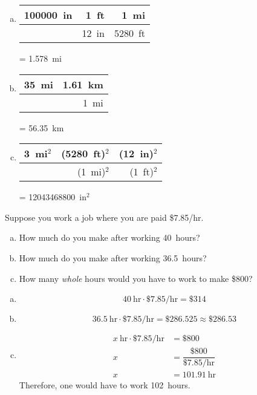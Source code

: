 \documentclass[11pt,letterpaper]{article}
\begin{document}
\sol
{\itshape
\begin{enumerate}[(a)]
\item \phantom{.}
	\begin{table}[!ht]
	\centering
	\begin{tabular}{r|r|r}
	100000~in & 1~ft & 1~mi \\ \hline
	& 12~in & 5280~ft
	\end{tabular}
	= 1.578~mi
	\end{table}

\item \phantom{.}
	\begin{table}[!ht]
	\centering
	\begin{tabular}{r|r}
	35~mi & 1.61~km \\ \hline
	& 1~mi
	\end{tabular}
	= 56.35~km
	\end{table}

\item \phantom{.}
	\begin{table}[!ht]
	\centering
	\begin{tabular}{r|r|r}
	3~mi$^2$ & (5280~ft)$^2$ & (12~in)$^2$ \\ \hline
	& (1~mi)$^2$ & (1~ft)$^2$
	\end{tabular}
	= 12043468800~in$^2$
	\end{table}
\end{enumerate}
}





\newpage





 Suppose you work a job where you are paid \$7.85/hr. 
\begin{enumerate}[(a)]
\item How much do you make after working 40~hours?
\item How much do you make after working 36.5~hours?
\item How many \textit{whole} hours would you have to work to make \$800?
\end{enumerate} \pspace

\sol 
{\itshape
\begin{enumerate}[(a)]
\item 
	\[
	40~\text{hr} \cdot \$7.85\text{/hr}= \$314
	\] \pspace

\item 
	\[
	36.5~\text{hr} \cdot \$7.85\text{/hr}= \$286.525 \approx \$286.53
	\] \pspace

\item 
	\[
	\begin{aligned}
	x~\text{hr} \cdot \$7.85\text{/hr}&= \$800 \\[0.3cm]
	x&= \dfrac{\$800}{\$7.85\text{/hr}} \\[0.3cm]
	x&= 101.91~\text{hr}
	\end{aligned}
	\] 
Therefore, one would have to work 102~hours. 
\end{enumerate}
}
\end{document}
